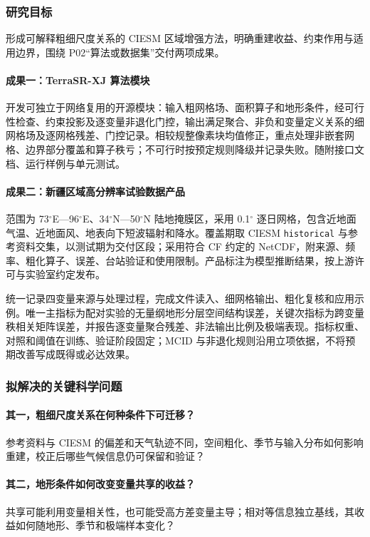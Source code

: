 \subsubsection{研究目标}

形成可解释粗细尺度关系的 CIESM 区域增强方法，明确重建收益、约束作用与适用边界，围绕 P02“算法或数据集”交付两项成果。

\paragraph{成果一：TerraSR-XJ 算法模块}
开发可独立于网络复用的开源模块：输入粗网格场、面积算子和地形条件，经可行性检查、约束投影及逐变量非退化门控，输出满足聚合、非负和变量定义关系的细网格场及逐网格残差、门控记录。相较规整像素块均值修正\cite{Geiss2022}，重点处理非嵌套网格、边界部分覆盖和算子秩亏；不可行时按预定规则降级并记录失败。随附接口文档、运行样例与单元测试。

\paragraph{成果二：新疆区域高分辨率试验数据产品}
范围为 73$^{\circ}$E—96$^{\circ}$E、34$^{\circ}$N—50$^{\circ}$N 陆地掩膜区，采用 0.1$^{\circ}$ 逐日网格，包含近地面气温、近地面风、地表向下短波辐射和降水。覆盖期取 CIESM \texttt{historical} 与参考资料交集，以测试期为交付区段；采用符合 CF 约定的 NetCDF，附来源、频率、粗化算子、误差、台站验证和使用限制。产品标注为模型推断结果，按上游许可与实验室约定发布。

统一记录四变量来源与处理过程，完成文件读入、细网格输出、粗化复核和应用示例。唯一主指标为配对实验的无量纲地形分层空间结构误差，关键次指标为跨变量秩相关矩阵误差，并报告逐变量聚合残差、非法输出比例及极端表现。指标权重、对照和阈值在训练、验证阶段固定；MCID 与非退化规则沿用立项依据，不将预期改善写成既得或必达效果。

\subsubsection{拟解决的关键科学问题}

\paragraph{其一，粗细尺度关系在何种条件下可迁移？}
参考资料与 CIESM 的偏差和天气轨迹不同，空间粗化、季节与输入分布如何影响重建，校正后哪些气候信息仍可保留和验证？

\paragraph{其二，地形条件如何改变变量共享的收益？}
共享可能利用变量相关性，也可能受高方差变量主导；相对等信息独立基线，其收益如何随地形、季节和极端样本变化？

